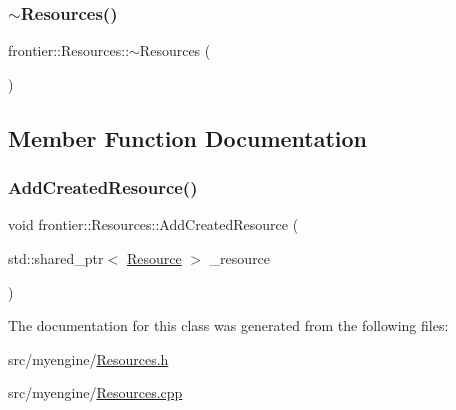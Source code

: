 \subsubsection{\texorpdfstring{$\sim$\+Resources()}{~Resources()}}
{\footnotesize\ttfamily frontier\+::\+Resources\+::$\sim$\+Resources (\begin{DoxyParamCaption}{ }\end{DoxyParamCaption})}



\subsection{Member Function Documentation}
\mbox{\label{classfrontier_1_1_resources_a34e0df1d6b935644bccee94ebe600a4a}} 
\subsubsection{\texorpdfstring{Add\+Created\+Resource()}{AddCreatedResource()}}
{\footnotesize\ttfamily void frontier\+::\+Resources\+::\+Add\+Created\+Resource (\begin{DoxyParamCaption}\item[{std\+::shared\+\_\+ptr$<$ \hyperlink{classfrontier_1_1_resource}{Resource} $>$}]{\+\_\+resource }\end{DoxyParamCaption})}



The documentation for this class was generated from the following files\+:\begin{DoxyCompactItemize}
\item 
src/myengine/\hyperlink{_resources_8h}{Resources.\+h}\item 
src/myengine/\hyperlink{_resources_8cpp}{Resources.\+cpp}\end{DoxyCompactItemize}
